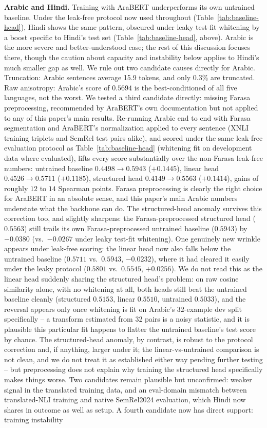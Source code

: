 \documentclass[manuscript]{acmart}
\begin{document}
\textbf{Arabic and Hindi.} Training with AraBERT underperforms its own untrained baseline. Under the leak-free protocol now used throughout (Table~\ref{tab:baseline-head}), Hindi shows the same pattern, obscured under leaky test-fit whitening by a boost specific to Hindi's test set (Table~\ref{tab:baseline-head}, above). Arabic is the more severe and better-understood case; the rest of this discussion focuses there, though the caution about capacity and instability below applies to Hindi's much smaller gap as well. We rule out two candidate causes directly for Arabic. Truncation: Arabic sentences average 15.9 tokens, and only $0.3\%$ are truncated. Raw anisotropy: Arabic's score of $0.5694$ is the best-conditioned of all five languages, not the worst. We tested a third candidate directly: missing Farasa preprocessing, recommended by AraBERT's own documentation but not applied to any of this paper's main results. Re-running Arabic end to end with Farasa segmentation and AraBERT's normalization applied to every sentence (XNLI training triplets and SemRel test pairs alike), and scored under the same leak-free evaluation protocol as Table~\ref{tab:baseline-head} (whitening fit on development data where evaluated), lifts every score substantially over the non-Farasa leak-free numbers: untrained baseline $0.4498\to0.5943$ ($+0.1445$), linear head $0.4526\to0.5711$ ($+0.1185$), structured head $0.4149\to0.5563$ ($+0.1414$), gains of roughly $12$ to $14$ Spearman points. Farasa preprocessing is clearly the right choice for AraBERT in an absolute sense, and this paper's main Arabic numbers understate what the backbone can do. The structured-head anomaly survives this correction too, and slightly sharpens: the Farasa-preprocessed structured head ($0.5563$) still trails its own Farasa-preprocessed untrained baseline ($0.5943$) by $-0.0380$ (vs.\ $-0.0267$ under leaky test-fit whitening). One genuinely new wrinkle appears under leak-free scoring: the linear head now also falls below the untrained baseline ($0.5711$ vs.\ $0.5943$, $-0.0232$), where it had cleared it easily under the leaky protocol ($0.5801$ vs.\ $0.5545$, $+0.0256$). We do not read this as the linear head suddenly sharing the structured head's problem: on raw cosine similarity alone, with no whitening at all, both heads still beat the untrained baseline cleanly (structured $0.5153$, linear $0.5510$, untrained $0.5033$), and the reversal appears only once whitening is fit on Arabic's $32$-example dev split specifically -- a transform estimated from 32 pairs is a noisy statistic, and it is plausible this particular fit happens to flatter the untrained baseline's test score by chance. The structured-head anomaly, by contrast, is robust to the protocol correction and, if anything, larger under it; the linear-vs-untrained comparison is not clean, and we do not treat it as established either way pending further testing -- but preprocessing does not explain why training the structured head specifically makes things worse. Two candidates remain plausible but unconfirmed: weaker signal in the translated training data, and an eval-domain mismatch between translated-NLI training and native SemRel2024 evaluation, which Hindi now shares in outcome as well as setup. A fourth candidate now has direct support: training instability 
\end{document}
